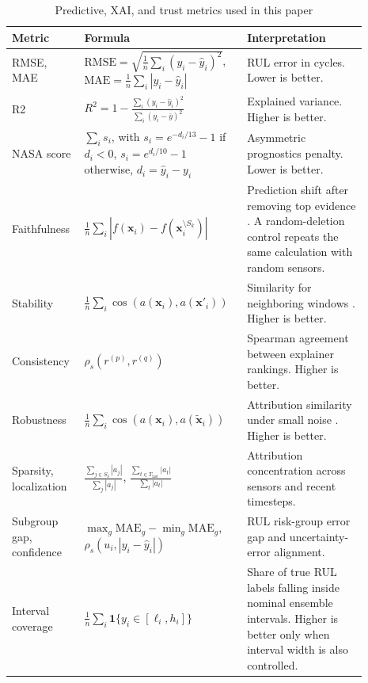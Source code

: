 \documentclass[conference]{IEEEtran}
\begin{document}
\begin{table}[!t]
\caption{Predictive, XAI, and trust metrics used in this paper}
\label{tab:metric_definitions}
\centering
\scriptsize
\begin{tabular}{p{0.18\linewidth}p{0.39\linewidth}p{0.32\linewidth}}
\toprule
Metric & Formula & Interpretation \\
\midrule
RMSE, MAE & \(\mathrm{RMSE}=\sqrt{\frac{1}{n}\sum_i(y_i-\hat{y}_i)^2}\), \(\mathrm{MAE}=\frac{1}{n}\sum_i|y_i-\hat{y}_i|\) & RUL error in cycles. Lower is better. \\
\addlinespace
R2 & \(R^2=1-\frac{\sum_i(y_i-\hat{y}_i)^2}{\sum_i(y_i-\bar{y})^2}\) & Explained variance. Higher is better. \\
\addlinespace
NASA score & \(\sum_i s_i\), with \(s_i=e^{-d_i/13}-1\) if \(d_i<0\), \(s_i=e^{d_i/10}-1\) otherwise, \(d_i=\hat{y}_i-y_i\) & Asymmetric prognostics penalty. Lower is better. \\
\addlinespace
Faithfulness & \(\frac{1}{n}\sum_i |f(\mathbf{x}_i)-f(\mathbf{x}^{\setminus S_k}_i)|\) & Prediction shift after removing top evidence \cite{samek2017evaluating,yeh2019infidelity}. A random-deletion control repeats the same calculation with random sensors. \\
\addlinespace
Stability & \(\frac{1}{n}\sum_i \cos(a(\mathbf{x}_i),a(\mathbf{x}'_i))\) & Similarity for neighboring windows \cite{alvarez2018robustness}. Higher is better. \\
\addlinespace
Consistency & \(\rho_s(r^{(p)},r^{(q)})\) & Spearman agreement between explainer rankings. Higher is better. \\
\addlinespace
Robustness & \(\frac{1}{n}\sum_i \cos(a(\mathbf{x}_i),a(\tilde{\mathbf{x}}_i))\) & Attribution similarity under small noise \cite{alvarez2018robustness,yeh2019infidelity}. Higher is better. \\
\addlinespace
Sparsity, localization & \(\frac{\sum_{j\in S_3}|a_j|}{\sum_j|a_j|}\), \(\frac{\sum_{t\in T_{\mathrm{last}}}|a_t|}{\sum_t|a_t|}\) & Attribution concentration across sensors and recent timesteps. \\
\addlinespace
Subgroup gap, confidence & \(\max_g \mathrm{MAE}_g-\min_g \mathrm{MAE}_g\), \(\rho_s(u_i,|y_i-\hat{y}_i|)\) & RUL risk-group error gap and uncertainty-error alignment. \\
\addlinespace
Interval coverage & \(\frac{1}{n}\sum_i \mathbf{1}\{y_i\in[\ell_i,h_i]\}\) & Share of true RUL labels falling inside nominal ensemble intervals. Higher is better only when interval width is also controlled. \\
\bottomrule
\end{tabular}
\end{table}
\end{document}
